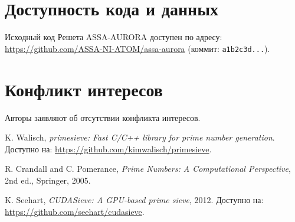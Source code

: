 \documentclass[11pt]{article}
\begin{document}
\section*{Доступность кода и данных}
Исходный код Решета ASSA-AURORA доступен по адресу: \url{https://github.com/ASSA-NI-ATOM/assa-aurora} (коммит: \texttt{a1b2c3d...}).

\section*{Конфликт интересов}
Авторы заявляют об отсутствии конфликта интересов.

\begin{thebibliography}{9}
K. Walisch, \emph{primesieve: Fast C/C++ library for prime number generation}. Доступно на: \url{https://github.com/kimwalisch/primesieve}.

R. Crandall and C. Pomerance, \emph{Prime Numbers: A Computational Perspective}, 2nd ed., Springer, 2005.

K. Seehart, \emph{CUDASieve: A GPU-based prime sieve}, 2012. Доступно на: \url{https://github.com/seehart/cudasieve}.

\end{thebibliography}
\end{document}
